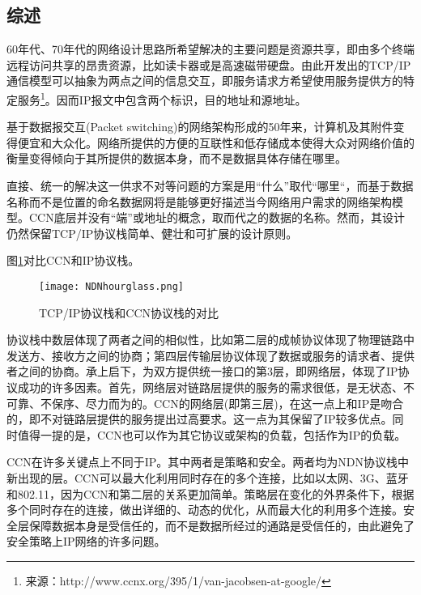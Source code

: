 \subsection{综述}
\par
60年代、70年代的网络设计思路所希望解决的主要问题是资源共享，即由多个终端远程访问共享的昂贵资源，比如读卡器或是高速磁带硬盘。由此开发出的TCP/IP通信模型可以抽象为两点之间的信息交互，即服务请求方希望使用服务提供方的特定服务\footnote{来源：http://www.ccnx.org/395/1/van-jacobsen-at-google/}。因而IP报文中包含两个标识，目的地址和源地址。
\par
基于数据报交互(Packet switching)的网络架构形成的50年来，计算机及其附件变得便宜和大众化。网络所提供的方便的互联性和低存储成本使得大众对网络价值的衡量变得倾向于其所提供的数据本身，而不是数据具体存储在哪里。
\par
直接、统一的解决这一供求不对等问题的方案是用“什么”取代“哪里“，而基于数据名称而不是位置的命名数据网将是能够更好描述当今网络用户需求的网络架构模型。CCN底层并没有“端”或地址的概念，取而代之的数据的名称。然而，其设计仍然保留TCP/IP协议栈简单、健壮和可扩展的设计原则。
\par
图\ref{fig:ProtocolStacks}对比CCN和IP协议栈。
\begin{figure}[h!]
	\centering
	\texttt{[image: NDNhourglass.png]}
	\caption{TCP/IP协议栈和CCN协议栈的对比}
	\label{fig:ProtocolStacks}
\end{figure}
\par
协议栈中数层体现了两者之间的相似性，比如第二层的成帧协议体现了物理链路中发送方、接收方之间的协商；第四层传输层协议体现了数据或服务的请求者、提供者之间的协商。承上启下，为双方提供统一接口的第3层，即网络层，体现了IP协议成功的许多因素。首先，网络层对链路层提供的服务的需求很低，是无状态、不可靠、不保序、尽力而为的。CCN的网络层(即第三层)，在这一点上和IP是吻合的，即不对链路层提供的服务提出过高要求。这一点为其保留了IP较多优点。同时值得一提的是，CCN也可以作为其它协议或架构的负载，包括作为IP的负载。
\par
CCN在许多关键点上不同于IP。其中两者是策略和安全。两者均为NDN协议栈中新出现的层。CCN可以最大化利用同时存在的多个连接，比如以太网、3G、蓝牙和802.11，因为CCN和第二层的关系更加简单。策略层在变化的外界条件下，根据多个同时存在的连接，做出详细的、动态的优化，从而最大化的利用多个连接。安全层保障数据本身是受信任的，而不是数据所经过的通路是受信任的，由此避免了安全策略上IP网络的许多问题。

